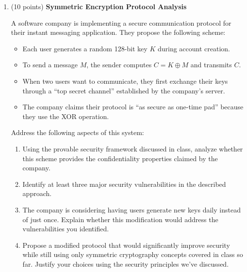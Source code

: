 \documentclass[10pt,a4paper,american]{exam}
\begin{document}
\begin{enumerate}
	\item (10 points) \textbf{Symmetric Encryption Protocol Analysis}

	      A software company is implementing a secure communication protocol for their instant messaging application. They propose the following scheme:

	      \begin{itemize}
		      \item Each user generates a random 128-bit key $K$ during account creation.
		      \item To send a message $M$, the sender computes $C = K \oplus M$ and transmits $C$.
		      \item When two users want to communicate, they first exchange their keys through a ``top secret channel'' established by the company's server.
		      \item The company claims their protocol is ``as secure as one-time pad'' because they use the XOR operation.
	      \end{itemize}

	      Address the following aspects of this system:
	      \begin{enumerate}
		      \item Using the provable security framework discussed in class, analyze whether this scheme provides the confidentiality properties claimed by the company.
		      \item Identify at least three major security vulnerabilities in the described approach.
		      \item The company is considering having users generate new keys daily instead of just once. Explain whether this modification would address the vulnerabilities you identified.
		      \item Propose a modified protocol that would significantly improve security while still using only symmetric cryptography concepts covered in class so far. Justify your choices using the security principles we've discussed.
	      \end{enumerate}
\end{enumerate}
\end{document}
